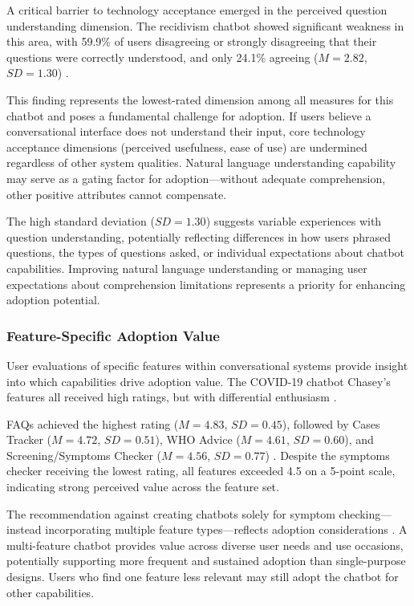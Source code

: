 \documentclass[manuscript,anonymous,sigconf]{acmart}
\begin{document}
A critical barrier to technology acceptance emerged in the perceived question understanding dimension. The recidivism chatbot showed significant weakness in this area, with 59.9\% of users disagreeing or strongly disagreeing that their questions were correctly understood, and only 24.1\% agreeing ($M = 2.82$, $SD = 1.30$) \cite{A54}.

This finding represents the lowest-rated dimension among all measures for this chatbot and poses a fundamental challenge for adoption. If users believe a conversational interface does not understand their input, core technology acceptance dimensions (perceived usefulness, ease of use) are undermined regardless of other system qualities. Natural language understanding capability may serve as a gating factor for adoption---without adequate comprehension, other positive attributes cannot compensate.

The high standard deviation ($SD = 1.30$) suggests variable experiences with question understanding, potentially reflecting differences in how users phrased questions, the types of questions asked, or individual expectations about chatbot capabilities. Improving natural language understanding or managing user expectations about comprehension limitations represents a priority for enhancing adoption potential.

\subsubsection{Feature-Specific Adoption Value}

User evaluations of specific features within conversational systems provide insight into which capabilities drive adoption value. The COVID-19 chatbot Chasey's features all received high ratings, but with differential enthusiasm \cite{A79}.

FAQs achieved the highest rating ($M = 4.83$, $SD = 0.45$), followed by Cases Tracker ($M = 4.72$, $SD = 0.51$), WHO Advice ($M = 4.61$, $SD = 0.60$), and Screening/Symptoms Checker ($M = 4.56$, $SD = 0.77$) \cite{A79}. Despite the symptoms checker receiving the lowest rating, all features exceeded 4.5 on a 5-point scale, indicating strong perceived value across the feature set.

The recommendation against creating chatbots solely for symptom checking---instead incorporating multiple feature types---reflects adoption considerations \cite{A79}. A multi-feature chatbot provides value across diverse user needs and use occasions, potentially supporting more frequent and sustained adoption than single-purpose designs. Users who find one feature less relevant may still adopt the chatbot for other capabilities.
\end{document}
